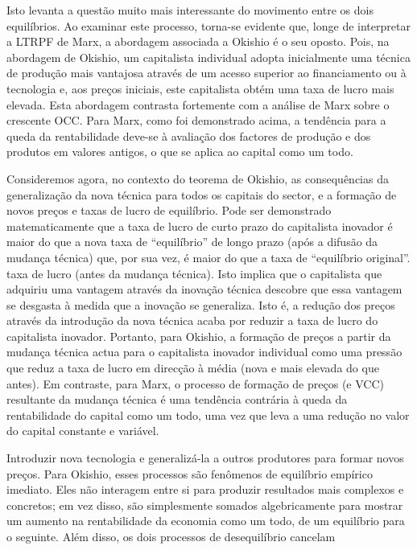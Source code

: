  \par 
Isto levanta a questão muito mais interessante do movimento entre os dois equilíbrios. Ao examinar este processo, torna-se evidente que, longe de interpretar a LTRPF de Marx, a abordagem associada a Okishio é o seu oposto. Pois, na abordagem de Okishio, um capitalista individual adopta inicialmente uma técnica de produção mais vantajosa através de um acesso superior ao financiamento ou à tecnologia e, aos preços iniciais, este capitalista obtém uma taxa de lucro mais elevada. Esta abordagem contrasta fortemente com a análise de Marx sobre o crescente OCC. Para Marx, como foi demonstrado acima, a tendência para a queda da rentabilidade deve-se à avaliação dos factores de produção e dos produtos em valores antigos, o que se aplica ao capital como um todo.
 \par 
Consideremos agora, no contexto do teorema de Okishio, as consequências da generalização da nova técnica para todos os capitais do sector, e a formação de novos preços e taxas de lucro de equilíbrio. Pode ser demonstrado matematicamente que a taxa de lucro de curto prazo do capitalista inovador é maior do que a nova taxa de “equilíbrio” de longo prazo (após a difusão da mudança técnica) que, por sua vez, é maior do que a taxa de “equilíbrio original”. taxa de lucro (antes da mudança técnica). Isto implica que o capitalista que adquiriu uma vantagem através da inovação técnica descobre que essa vantagem se desgasta à medida que a inovação se generaliza. Isto é, a redução dos preços através da introdução da nova técnica acaba por reduzir a taxa de lucro do capitalista inovador. Portanto, para Okishio, a formação de preços a partir da mudança técnica actua para o capitalista inovador individual como uma pressão que reduz a taxa de lucro em direcção à média (nova e mais elevada do que antes). Em contraste, para Marx, o processo de formação de preços (e VCC) resultante da mudança técnica é uma tendência contrária à queda da rentabilidade do capital como um todo, uma vez que leva a uma redução no valor do capital constante e variável.
 \par 
Introduzir nova tecnologia e generalizá-la a outros produtores para formar novos preços. Para Okishio, esses processos são fenômenos de equilíbrio empírico imediato. Eles não interagem entre si para produzir resultados mais complexos e concretos; em vez disso, são simplesmente somados algebricamente para mostrar um aumento na rentabilidade da economia como um todo, de um equilíbrio para o seguinte. Além disso, os dois processos de desequilíbrio cancelam
